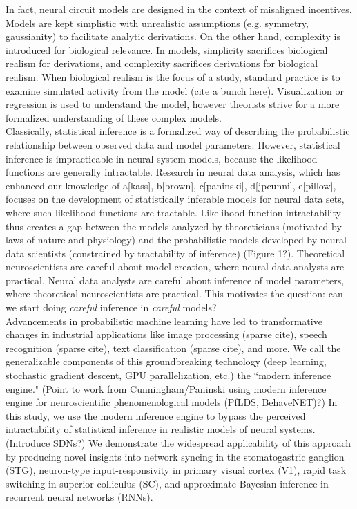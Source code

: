 \documentclass[11pt]{article}
\begin{document}

In fact, neural circuit models are designed in the context of misaligned incentives.  Models are kept simplistic with unrealistic assumptions (e.g. symmetry, gaussianity) to facilitate analytic derivations.  On the other hand, complexity is introduced for biological relevance. In models, simplicity sacrifices biological realism for derivations, and complexity sacrifices derivations for biological realism. When biological realism is the focus of a study, standard practice is to examine simulated activity from the model \cite{gutierrez2013multiple} (cite a bunch here).  Visualization or regression is used to understand the model, however theorists strive for a more formalized understanding of these complex models. \\

Classically, statistical inference is a formalized way of describing the probabilistic relationship between observed data and model parameters.  However, statistical inference is impracticable in neural system models, because the likelihood functions are generally intractable.  Research in neural data analysis, which has enhanced our knowledge of a[kass], b[brown], c[paninski], d[jpcunni], e[pillow], focuses on the development of statistically inferable models for neural data sets, where such likelihood functions are tractable. Likelihood function intractability thus creates a gap between the models analyzed by theoreticians (motivated by laws of nature and physiology) and the probabilistic models developed by neural data scientists (constrained by tractability of inference) (Figure 1?).   Theoretical neuroscientists are careful about model creation, where neural data analysts are practical.  Neural data analysts are careful about inference of model parameters, where theoretical neuroscientists are practical.  This motivates the question: can we start doing \emph{careful} inference in \emph{careful} models? \\

Advancements in probabilistic machine learning have led to transformative changes in industrial applications like image processing (sparse cite), speech recognition (sparse cite), text classification (sparse cite), and more.  We call the generalizable components of this groundbreaking technology (deep learning, stochastic gradient descent, GPU parallelization, etc.) the ``modern inference engine." (Point to work from Cunningham/Paninski using modern inference engine for neuroscientific phenomenological models (PfLDS, BehaveNET)?) In this study, we use the modern inference engine to bypass the perceived intractability of statistical inference in realistic models of neural systems.  (Introduce SDNs?)  We demonstrate the widespread applicability of this approach by producing novel insights into network syncing in the stomatogastric ganglion (STG), neuron-type input-responsivity in primary visual cortex (V1), rapid task switching in superior colliculus (SC), and approximate Bayesian inference in recurrent neural networks (RNNs). \\
\end{document}
